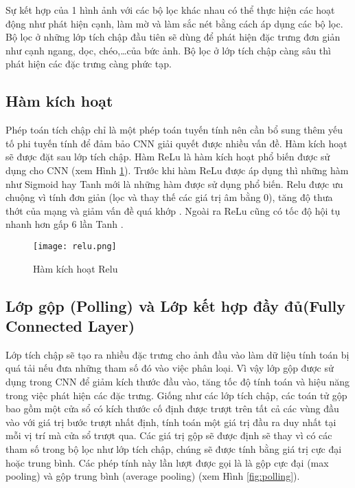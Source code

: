\documentclass[../the.tex]{subfiles}
\begin{document}
{\fontsize{13}{12} \selectfont

Sự kết hợp của 1 hình ảnh với các bộ lọc khác nhau có thể thực hiện các hoạt động như phát hiện cạnh, làm mờ và làm sắc nét bằng cách áp dụng các bộ lọc.
Bộ lọc ở những lớp tích chập đầu tiên sẽ dùng để phát hiện đặc trưng đơn giản như cạnh ngang, dọc, chéo,\dots của bức ảnh. Bộ lọc ở lớp tích chập càng sâu thì phát hiện các đặc trưng càng phức tạp.

}


\subsection{Hàm kích hoạt}

{\fontsize{13}{12} \selectfont

	Phép toán tích chập chỉ là một phép toán tuyến tính nên cần bổ sung thêm yếu tố phi tuyến tính để đảm bảo CNN giải quyết được nhiều vấn đề.
	Hàm kích hoạt sẽ được đặt sau lớp tích chập.
	Hàm ReLu \cite{nair2010rectified} là hàm kích hoạt phổ biến được sử dụng cho CNN  (xem Hình \ref{fig:relu}). Trước khi hàm ReLu được áp dụng thì những hàm như Sigmoid hay Tanh mới là những hàm được sử dụng phổ biến.
	Relu được ưu chuộng vì tính đơn giản (lọc và thay thế các giá trị âm bằng 0), tăng độ thưa thớt của mạng và giảm vấn đề quá khớp \cite{caruana2000overfitting}.
	Ngoài ra ReLu cũng có tốc độ hội tụ nhanh hơn gấp 6 lần Tanh \cite{krizhevsky2012imagenet}.

}

\begin{figure}[H]
	\centering
	\texttt{[image: relu.png]}
	\caption{Hàm kích hoạt Relu}
	\label{fig:relu}
\end{figure}

\subsection{Lớp gộp (Polling) và Lớp kết hợp đầy đủ(Fully Connected Layer)}

{\fontsize{13}{12} \selectfont

	Lớp tích chập sẽ tạo ra nhiều đặc trưng cho ảnh đầu vào làm dữ liệu tính toán bị quá tải nếu đưa những tham số đó vào việc phân loại.
	Vì vậy lớp gộp được sử dụng trong CNN để giảm kích thước đầu vào, tăng tốc độ tính toán và hiệu năng trong việc phát hiện các đặc trưng.
	Giống như các lớp tích chập, các toán tử gộp bao gồm một cửa sổ có kích thước cố định được trượt trên tất cả các vùng đầu vào với giá trị bước trượt nhất định, tính toán một giá trị đầu ra duy nhất tại mỗi vị trí mà cửa sổ trượt qua.
	Các giá trị gộp sẽ được định sẽ thay vì có các tham số trong bộ lọc như lớp tích chập, chúng sẽ được tính bằng giá trị cực đại hoặc trung bình.
	Các phép tính này lần lượt được gọi là là gộp cực đại (max pooling) và gộp trung bình (average pooling) (xem Hình
	\ref{fig:polling}).

}
\end{document}
